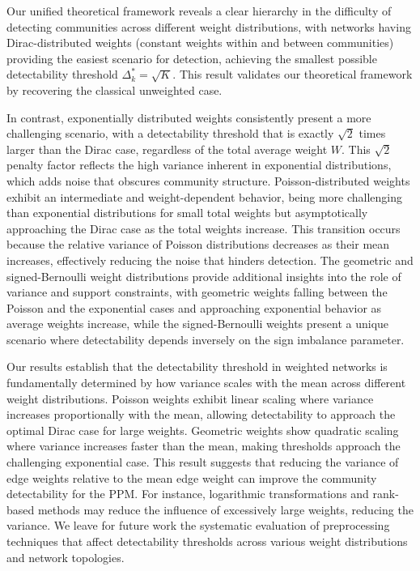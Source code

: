 \documentclass[a4paper,pre,superscriptaddress,floatfix,nofootinbib,twocolumn]{revtex4-1}
\begin{document}
Our unified theoretical framework reveals a clear hierarchy in the difficulty of detecting communities across different weight distributions, with networks having Dirac-distributed weights (constant weights within and between communities) providing the easiest scenario for detection, achieving the smallest possible detectability threshold $\Delta_k^* = \sqrt{K}$. This result validates our theoretical framework by recovering the classical unweighted case.

In contrast, exponentially distributed weights consistently present a more challenging scenario, with a detectability threshold that is exactly $\sqrt{2}$ times larger than the Dirac case, regardless of the total average weight $W$. This $\sqrt{2}$ penalty factor reflects the high variance inherent in exponential distributions, which adds noise that obscures community structure. Poisson-distributed weights exhibit an intermediate and weight-dependent behavior, being more challenging than exponential distributions for small total weights but asymptotically approaching the  Dirac case as the total weights increase. This transition occurs because the relative variance of Poisson distributions decreases as their mean increases, effectively reducing the noise that hinders detection. The geometric and signed-Bernoulli weight distributions provide additional insights into the role of variance and support constraints, with geometric weights falling between the Poisson and the exponential cases and approaching exponential behavior as average weights increase, while the signed-Bernoulli weights present a unique scenario where detectability depends inversely on the sign imbalance parameter.

Our results establish that the detectability threshold in weighted networks is fundamentally determined by how variance scales with the mean across different weight distributions. Poisson weights exhibit linear scaling where variance increases proportionally with the mean, allowing detectability to approach the optimal Dirac case for large weights. Geometric weights show quadratic scaling where variance increases faster than the mean, making thresholds approach the challenging exponential case.
This result suggests that reducing the variance of edge weights relative to the mean edge weight can improve the community detectability for the PPM.
For instance, logarithmic transformations and rank-based methods may reduce the influence of excessively large weights, reducing the variance.
We leave for future work the systematic evaluation of preprocessing techniques that affect detectability thresholds across various weight distributions and network topologies.
\end{document}
